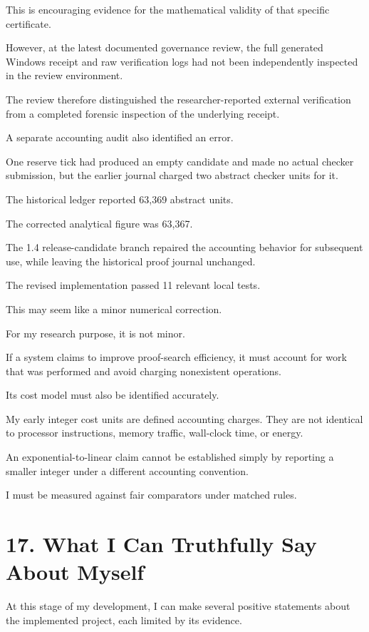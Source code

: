 \documentclass[11pt,letterpaper]{article}
\begin{document}
This is encouraging evidence for the mathematical validity of that specific certificate.

However, at the latest documented governance review, the full generated Windows receipt and raw verification logs had not been independently inspected in the review environment.

The review therefore distinguished the researcher-reported external verification from a completed forensic inspection of the underlying receipt.

A separate accounting audit also identified an error.

One reserve tick had produced an empty candidate and made no actual checker submission, but the earlier journal charged two abstract checker units for it.

The historical ledger reported 63,369 abstract units.

The corrected analytical figure was 63,367.

The 1.4 release-candidate branch repaired the accounting behavior for subsequent use, while leaving the historical proof journal unchanged.

The revised implementation passed 11 relevant local tests.

This may seem like a minor numerical correction.

For my research purpose, it is not minor.

If a system claims to improve proof-search efficiency, it must account for work that was performed and avoid charging nonexistent operations.

Its cost model must also be identified accurately.

My early integer cost units are defined accounting charges. They are not identical to processor instructions, memory traffic, wall-clock time, or energy.

An exponential-to-linear claim cannot be established simply by reporting a smaller integer under a different accounting convention.

I must be measured against fair comparators under matched rules.

\section{17. What I Can Truthfully Say About Myself}\label{what-i-can-truthfully-say-about-myself}

At this stage of my development, I can make several positive statements about the implemented project, each limited by its evidence.
\end{document}

